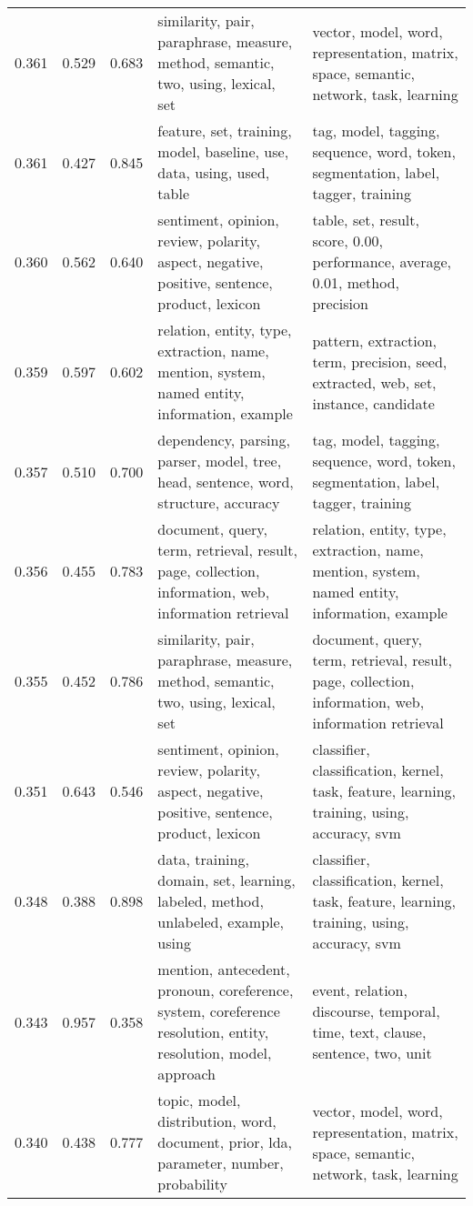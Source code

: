 \begin{tabular}{cccp{5cm}p{5cm}}
0.361 & 0.529 & 0.683 & similarity, pair, paraphrase, measure, method, semantic, two, using, lexical, set & vector, model, word, representation, matrix, space, semantic, network, task, learning \\
0.361 & 0.427 & 0.845 & feature, set, training, model, baseline, use, data, using, used, table & tag, model, tagging, sequence, word, token, segmentation, label, tagger, training \\
0.360 & 0.562 & 0.640 & sentiment, opinion, review, polarity, aspect, negative, positive, sentence, product, lexicon & table, set, result, score, 0.00, performance, average, 0.01, method, precision \\
0.359 & 0.597 & 0.602 & relation, entity, type, extraction, name, mention, system, named entity, information, example & pattern, extraction, term, precision, seed, extracted, web, set, instance, candidate \\
0.357 & 0.510 & 0.700 & dependency, parsing, parser, model, tree, head, sentence, word, structure, accuracy & tag, model, tagging, sequence, word, token, segmentation, label, tagger, training \\
0.356 & 0.455 & 0.783 & document, query, term, retrieval, result, page, collection, information, web, information retrieval & relation, entity, type, extraction, name, mention, system, named entity, information, example \\
0.355 & 0.452 & 0.786 & similarity, pair, paraphrase, measure, method, semantic, two, using, lexical, set & document, query, term, retrieval, result, page, collection, information, web, information retrieval \\
0.351 & 0.643 & 0.546 & sentiment, opinion, review, polarity, aspect, negative, positive, sentence, product, lexicon & classifier, classification, kernel, task, feature, learning, training, using, accuracy, svm \\
0.348 & 0.388 & 0.898 & data, training, domain, set, learning, labeled, method, unlabeled, example, using & classifier, classification, kernel, task, feature, learning, training, using, accuracy, svm \\
0.343 & 0.957 & 0.358 & mention, antecedent, pronoun, coreference, system, coreference resolution, entity, resolution, model, approach & event, relation, discourse, temporal, time, text, clause, sentence, two, unit \\
0.340 & 0.438 & 0.777 & topic, model, distribution, word, document, prior, lda, parameter, number, probability & vector, model, word, representation, matrix, space, semantic, network, task, learning \\

\end{tabular}
